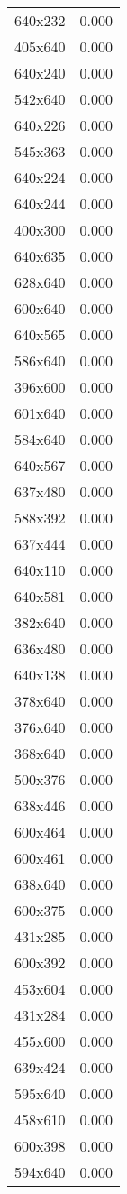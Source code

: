 \begin{table}
\begin{tabular}{lr}
640x232 & 0.000 \\
405x640 & 0.000 \\
640x240 & 0.000 \\
542x640 & 0.000 \\
640x226 & 0.000 \\
545x363 & 0.000 \\
640x224 & 0.000 \\
640x244 & 0.000 \\
400x300 & 0.000 \\
640x635 & 0.000 \\
628x640 & 0.000 \\
600x640 & 0.000 \\
640x565 & 0.000 \\
586x640 & 0.000 \\
396x600 & 0.000 \\
601x640 & 0.000 \\
584x640 & 0.000 \\
640x567 & 0.000 \\
637x480 & 0.000 \\
588x392 & 0.000 \\
637x444 & 0.000 \\
640x110 & 0.000 \\
640x581 & 0.000 \\
382x640 & 0.000 \\
636x480 & 0.000 \\
640x138 & 0.000 \\
378x640 & 0.000 \\
376x640 & 0.000 \\
368x640 & 0.000 \\
500x376 & 0.000 \\
638x446 & 0.000 \\
600x464 & 0.000 \\
600x461 & 0.000 \\
638x640 & 0.000 \\
600x375 & 0.000 \\
431x285 & 0.000 \\
600x392 & 0.000 \\
453x604 & 0.000 \\
431x284 & 0.000 \\
455x600 & 0.000 \\
639x424 & 0.000 \\
595x640 & 0.000 \\
458x610 & 0.000 \\
600x398 & 0.000 \\
594x640 & 0.000 \\

\end{tabular}
\end{table}
